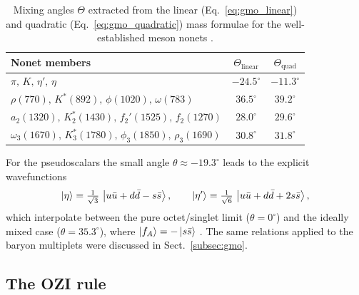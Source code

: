 \begin{table}[t]
    \centering
    \caption{Mixing angles $\Theta$ extracted from the linear
    (Eq.~\eqref{eq:gmo_linear}) and quadratic (Eq.~\eqref{eq:gmo_quadratic}) mass
    formulae for the well-established meson nonets \cite[Ch.~5]{Amsler2018}.}
    \label{tab:mixing_angles}
    \begin{tabular}{lcc}
        \hline
        Nonet members &
        $\Theta_{\mathrm{linear}}$ &
        $\Theta_{\mathrm{quad}}$ \\
        \hline
        $\pi,\,K,\,\eta',\,\eta$ &
        $-24.5^\circ$ & $-11.3^\circ$ \\
        $\rho(770),\,K^*(892),\,\phi(1020),\,\omega(783)$ &
        $36.5^\circ$ & $39.2^\circ$ \\
        $a_2(1320),\,K_2^*(1430),\,f_2'(1525),\,f_2(1270)$ &
        $28.0^\circ$ & $29.6^\circ$ \\
        $\omega_3(1670),\,K_3^*(1780),\,\phi_3(1850),\,\rho_3(1690)$ &
        $30.8^\circ$ & $31.8^\circ$ \\
        \hline
    \end{tabular}
\end{table}

For the pseudoscalars the small angle $\theta \approx -19.3^\circ$ leads to the
explicit wavefunctions
\begin{equation}
    \ket{\eta}  = \tfrac{1}{\sqrt 3}\,\ket{u\bar u + d\bar d - s\bar s},
    \qquad
    \ket{\eta'} = \tfrac{1}{\sqrt 6}\,\ket{u\bar u + d\bar d + 2s\bar s},
    \label{eq:eta_states}
\end{equation}
which interpolate between the pure octet/singlet limit ($\theta = 0^\circ$) and the
ideally mixed case ($\theta = 35.3^\circ$), where $\ket{f_A} = -\ket{s\bar s}$
\cite[Ch.~5]{Amsler2018}. The same relations applied to the baryon multiplets were
discussed in Sect.~\ref{subsec:gmo}.

\subsection{The OZI rule}
\label{subsec:ozi}

